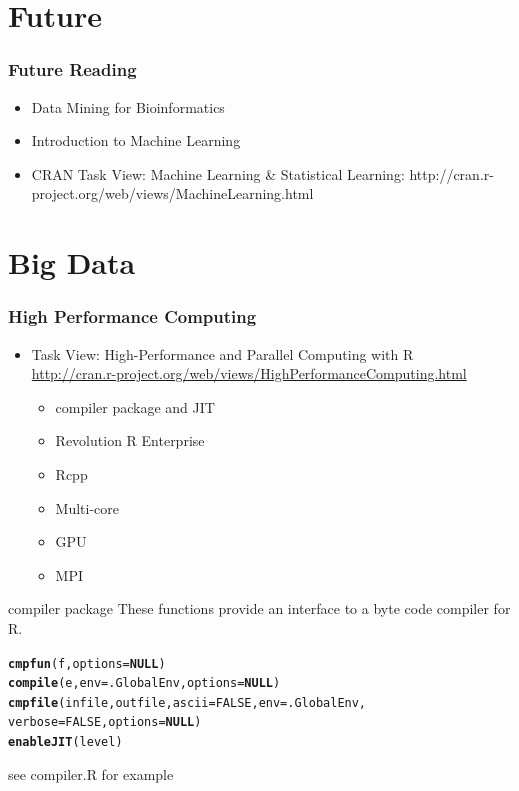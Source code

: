 \documentclass[UTF8]{beamer}\usepackage[]{graphicx}\usepackage[]{color}
\makeatletter
\newcommand{\hlnum}[1]{\textcolor[rgb]{0.686,0.059,0.569}{#1}}%
\newcommand{\hlstd}[1]{\textcolor[rgb]{0.345,0.345,0.345}{#1}}%
\newcommand{\hlkwa}[1]{\textcolor[rgb]{0.161,0.373,0.58}{\textbf{#1}}}%
\newcommand{\hlkwc}[1]{\textcolor[rgb]{0.333,0.667,0.333}{#1}}%
\newcommand{\hlkwd}[1]{\textcolor[rgb]{0.737,0.353,0.396}{\textbf{#1}}}%
\newenvironment{kframe}{%
 \def\at@end@of@kframe{}%
 \ifinner\ifhmode%
  \def\at@end@of@kframe{\end{minipage}}%
  \begin{minipage}{\columnwidth}%
 \fi\fi%
 \def\FrameCommand##1{\hskip\@totalleftmargin \hskip-\fboxsep
 \colorbox{shadecolor}{##1}\hskip-\fboxsep
     \hskip-\linewidth \hskip-\@totalleftmargin \hskip\columnwidth}%
 \MakeFramed {\advance\hsize-\width
   \@totalleftmargin\z@ \linewidth\hsize
   \@setminipage}}%
 {\par\unskip\endMakeFramed%
 \at@end@of@kframe}
\newenvironment{knitrout}{}{} %
\makeatother
\begin{document}
\section{Future}

\begin{frame}
  \frametitle{Future Reading}
\begin{itemize}
\item Data Mining for Bioinformatics
\item Introduction to Machine Learning
\item CRAN Task View: Machine Learning \& Statistical Learning: http://cran.r-project.org/web/views/MachineLearning.html
\end{itemize}
\end{frame}

\section{Big Data}
\begin{frame}
  \frametitle{High Performance Computing}
  \begin{itemize}
    \item Task View: High-Performance and Parallel Computing with R\\
    \url{http://cran.r-project.org/web/views/HighPerformanceComputing.html}
    \begin{itemize}
      \item compiler package and JIT
      \item Revolution R Enterprise
      \item Rcpp
      \item Multi-core
      \item GPU
      \item MPI
    \end{itemize}
  \end{itemize}
\end{frame}

\begin{frame}[t]{compiler package}
    These functions provide an interface to a byte code compiler for R.
\begin{knitrout}
\color{fgcolor}\begin{kframe}
\begin{alltt}
 \hlkwd{cmpfun}\hlstd{(f,} \hlkwc{options} \hlstd{=} \hlkwa{NULL}\hlstd{)}
 \hlkwd{compile}\hlstd{(e,} \hlkwc{env} \hlstd{= .GlobalEnv,} \hlkwc{options} \hlstd{=} \hlkwa{NULL}\hlstd{)}
 \hlkwd{cmpfile}\hlstd{(infile, outfile,} \hlkwc{ascii} \hlstd{=} \hlnum{FALSE}\hlstd{,} \hlkwc{env} \hlstd{= .GlobalEnv,}
        \hlkwc{verbose} \hlstd{=} \hlnum{FALSE}\hlstd{,} \hlkwc{options} \hlstd{=} \hlkwa{NULL}\hlstd{)}
 \hlkwd{enableJIT}\hlstd{(level)}
\end{alltt}
\end{kframe}
\end{knitrout}

see compiler.R for example
\end{frame}
\end{document}
